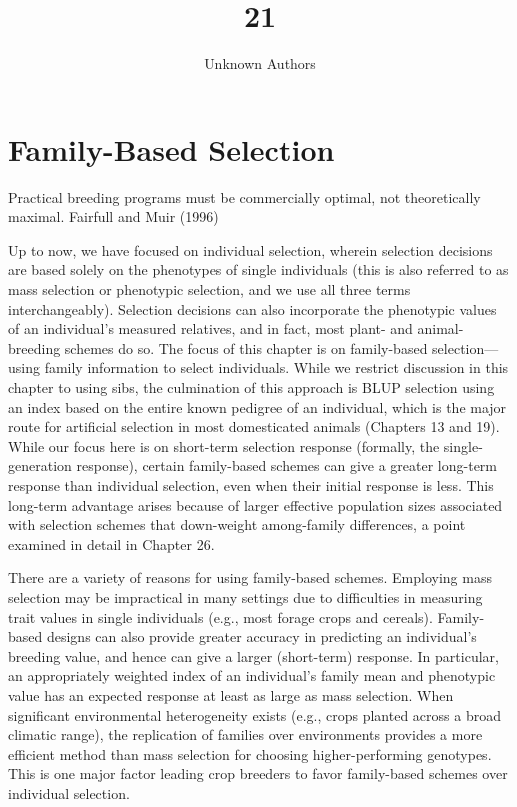\documentclass{article}
\title{21}
\author{Unknown Authors}
\date{}
\begin{document}
\maketitle

\begin{abstract}

\end{abstract}

\section{Family-Based Selection}
Practical breeding programs must be commercially optimal, not theoretically maximal. Fairfull and Muir (1996)

Up to now, we have focused on individual selection, wherein selection decisions are based solely on the phenotypes of single individuals (this is also referred to as mass selection or phenotypic selection, and we use all three terms interchangeably). Selection decisions can also incorporate the phenotypic values of an individual's measured relatives, and in fact, most plant- and animal-breeding schemes do so. The focus of this chapter is on family-based selection—using family information to select individuals. While we restrict discussion in this chapter to using sibs, the culmination of this approach is BLUP selection using an index based on the entire known pedigree of an individual, which is the major route for artificial selection in most domesticated animals (Chapters 13 and 19). While our focus here is on short-term selection response (formally, the single-generation response), certain family-based schemes can give a greater long-term response than individual selection, even when their initial response is less. This long-term advantage arises because of larger effective population sizes associated with selection schemes that down-weight among-family differences, a point examined in detail in Chapter 26.

There are a variety of reasons for using family-based schemes. Employing mass selection may be impractical in many settings due to difficulties in measuring trait values in single individuals (e.g., most forage crops and cereals). Family-based designs can also provide greater accuracy in predicting an individual's breeding value, and hence can give a larger (short-term) response. In particular, an appropriately weighted index of an individual's family mean and phenotypic value has an expected response at least as large as mass selection. When significant environmental heterogeneity exists (e.g., crops planted across a broad climatic range), the replication of families over environments provides a more efficient method than mass selection for choosing higher-performing genotypes. This is one major factor leading crop breeders to favor family-based schemes over individual selection.
\end{document}
